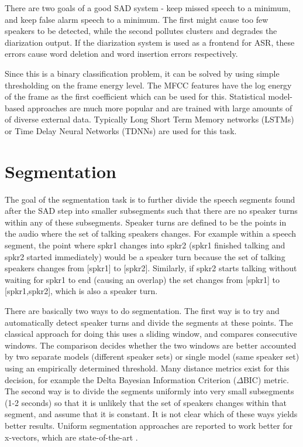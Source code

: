 There are two goals of a good SAD system - keep missed speech to a minimum, and keep false alarm speech to a minimum. The first might cause too few speakers to be detected, while the second pollutes clusters and degrades the diarization output. If the diarization system is used as a frontend for ASR, these errors cause word deletion and word insertion errors respectively.

Since this is a binary classification problem, it can be solved by using simple thresholding on the frame energy level. The MFCC features have the log energy of the frame as the first coefficient which can be used for this. Statistical model-based approaches are much more popular and are trained with large amounts of of diverse external data. Typically Long Short Term Memory networks (LSTMs) or Time Delay Neural Networks (TDNNs) are used for this task.

\section{Segmentation}

The goal of the segmentation task is to further divide the speech segments found after the SAD step into smaller subsegments such that there are no speaker turns within any of these subsegments. Speaker turns are defined to be the points in the audio where the set of talking speakers changes. For example within a speech segment, the point where spkr1 changes into spkr2 (spkr1 finished talking and spkr2 started immediately) would be a speaker turn because the set of talking speakers changes from [spkr1] to [spkr2]. Similarly, if spkr2 starts talking without waiting for spkr1 to end (causing an overlap) the set changes from [spkr1] to [spkr1,spkr2], which is also a speaker turn.

There are basically two ways to do segmentation. The first way is to try and automatically detect speaker turns and divide the segments at these points. The classical approach for doing this uses a sliding window, and compares consecutive windows.	The comparison decides whether the two windows are better accounted by two separate models (different speaker sets) or single model (same speaker set) using an empirically determined threshold. Many distance metrics exist for this decision, for example the Delta Bayesian Information Criterion ($\Delta$BIC) \cite{Chen1998SpeakerE} metric. The second way is to divide the segments uniformly into very small subsegments (1-2 seconds) so that it is unlikely that the set of speakers changes within that segment, and assume that it is constant. It is not clear which of these ways yields better results. Uniform segmentation approaches are reported to work better for x-vectors, which are state-of-the-art \cite{patino2018odessa}.

